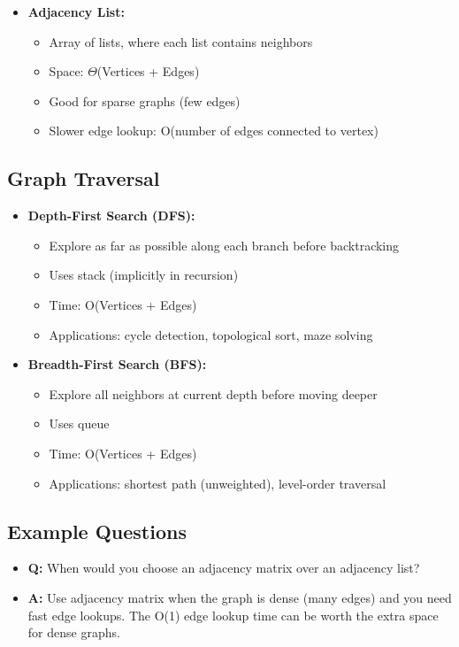 \documentclass[11pt,a4paper]{article}
\begin{document}
\begin{multicols}{2}
\begin{itemize}
    \item \textbf{Adjacency List:}
    \begin{itemize}
        \item Array of lists, where each list contains neighbors
        \item Space: $\Theta$(Vertices + Edges)
        \item Good for sparse graphs (few edges)
        \item Slower edge lookup: O(number of edges connected to vertex)
    \end{itemize}
\end{itemize}

\subsection{Graph Traversal}
\begin{itemize}
    \item \textbf{Depth-First Search (DFS):}
    \begin{itemize}
        \item Explore as far as possible along each branch before backtracking
        \item Uses stack (implicitly in recursion)
        \item Time: O(Vertices + Edges)
        \item Applications: cycle detection, topological sort, maze solving
    \end{itemize}

    \item \textbf{Breadth-First Search (BFS):}
    \begin{itemize}
        \item Explore all neighbors at current depth before moving deeper
        \item Uses queue
        \item Time: O(Vertices + Edges)
        \item Applications: shortest path (unweighted), level-order traversal
    \end{itemize}
\end{itemize}

\subsection{Example Questions}
\begin{itemize}
    \item \textbf{Q:} When would you choose an adjacency matrix over an adjacency list?
    \item \textbf{A:} Use adjacency matrix when the graph is dense (many edges) and you need fast edge lookups. The O(1) edge lookup time can be worth the extra space for dense graphs.


\end{itemize}
\end{multicols}
\end{document}
